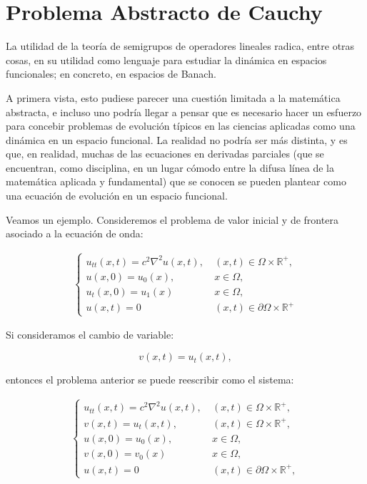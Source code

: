 \chapter{Problema Abstracto de Cauchy}
\label{ch:cauchy}
La utilidad de la teoría de semigrupos de operadores lineales radica, entre otras cosas, en su utilidad como lenguaje para estudiar la dinámica en espacios funcionales; en concreto, en espacios de Banach. 

A primera vista, esto pudiese parecer una cuestión limitada a la matemática abstracta, e incluso uno podría llegar a pensar que es necesario hacer un esfuerzo para concebir problemas de evolución típicos en las ciencias aplicadas como una dinámica en un espacio funcional. La realidad no podría ser más distinta, y es que, en realidad, muchas de las ecuaciones en derivadas parciales (que se encuentran, como disciplina, en un lugar cómodo entre la difusa línea de la matemática aplicada y fundamental) que se conocen se pueden plantear como una ecuación de evolución en un espacio funcional. 

Veamos un ejemplo. Consideremos el problema de valor inicial y de frontera asociado a la ecuación de onda:

\begin{align}
\label{eqOnda}
    \begin{cases}
        u_{tt}(x,t) = c^2 \nabla^2 u(x,t), \ &(x,t) \in \Omega \times \mathbb{R}^+,\\
        u(x,0) = u_0(x), \ &x \in \Omega,\\
        u_t(x,0)  = u_1(x) \ &x \in \Omega,\\
        u(x,t) = 0 \ &(x,t) \in \partial \Omega \times \mathbb{R}^+ 
    \end{cases}
\end{align}

Si consideramos el cambio de variable:

\[v(x,t) = u_t(x,t),\]

entonces el problema anterior se puede reescribir como el sistema:

\begin{align}
\label{eqOndaCambioDeVar}
    \begin{cases}
        u_{tt}(x,t) = c^2 \nabla^2 u(x,t), \ &(x,t) \in \Omega \times \mathbb{R}^+,\\
        v(x,t) = u_t(x,t), \ &(x,t) \in \Omega \times \mathbb{R}^+,\\
        u(x,0) = u_0(x), \ &x \in \Omega,\\
        v(x,0)  = v_0(x) \ &x \in \Omega,\\
        u(x,t) = 0 \ &(x,t) \in \partial \Omega \times \mathbb{R}^+,
    \end{cases}
\end{align}

